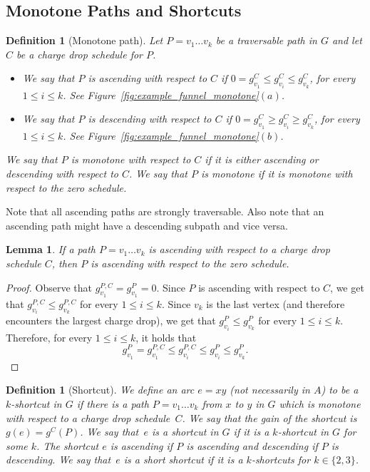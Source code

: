 \documentclass[11pt]{article}
\newtheorem{lemma}[theorem]{Lemma}
\newtheorem{definition}[theorem]{Definition}
\begin{document}
\subsection{Monotone Paths and Shortcuts}

\begin{definition}[Monotone path]\label{def:monotone-path}
    Let $P=v_1\ldots v_k$ be a traversable path in $G$ and let $C$ be a charge drop schedule for $P$.
    \begin{itemize}
        \item We say that $P$ is ascending with respect to $C$ if $0 = g^{C}_{v_1} \le g^C_{v_i} \le g^C_{v_k}$, for every $1\le i\le k$. See Figure~\ref{fig:example_funnel_monotone}$(a)$.
        \item We say that $P$ is descending with respect to $C$ if $0 = g^C_{v_1} \ge g^C_{v_i} \ge g^C_{v_k}$, for every $1\le i\le k$. See Figure~\ref{fig:example_funnel_monotone}$(b)$.
    \end{itemize}
    We say that $P$ is monotone with respect to $C$ if it is either ascending or descending with respect to $C$. We say that $P$ is monotone if it is monotone with respect to the zero schedule.
\end{definition}

Note that all ascending paths are strongly traversable. Also note that an ascending path might have a descending subpath and vice versa.


\begin{lemma}\label{lem:ascending_no_CDS}
    If a path $P=v_1\ldots v_k$ is ascending with respect to a charge drop schedule $C$, then $P$ is ascending with respect to the zero schedule.
\end{lemma}

\begin{proof}
    Observe that $g^{P,C}_{v_1} = g^{P}_{v_1}=0$. Since $P$ is ascending with respect to $C$, we get that $g^{P,C}_{v_i} \le g^{P,C}_{v_k}$ for every $1\le i\le k$. Since $v_k$ is the last vertex (and therefore encounters the largest charge drop), we get that  $g^{P}_{v_i} \le g^{P}_{v_k}$ for every $1\le i \le k$. Therefore, for every $1 \le i \le k$, it holds that 
    $$g^{P}_{v_1} = g^{P,C}_{v_1} \le g^{P,C}_{v_i} \le g^{P}_{v_i} \le g^{P}_{v_k}.$$
\end{proof}

\begin{definition}[Shortcut]
    We define an arc $e=xy$ (not necessarily in $A$) to be a $k$-\emph{shortcut} in $G$  if there is a path $P=v_1\ldots v_k$ from $x$ to $y$ in $G$ which is monotone with respect to a charge drop schedule~$C$.
    We say that the gain of the shortcut is 
     $g(e)=g^C(P)$. We say that~$e$ is a shortcut in $G$ if it is a $k$-shortcut in $G$ for some $k$.
    The shortcut $e$ is ascending if $P$ is ascending and descending if $P$ is descending. We say that~$e$ is a short shortcut if it is a $k$-shortcuts for $k\in \{ 2,3\}$.
\end{definition}
\end{document}

